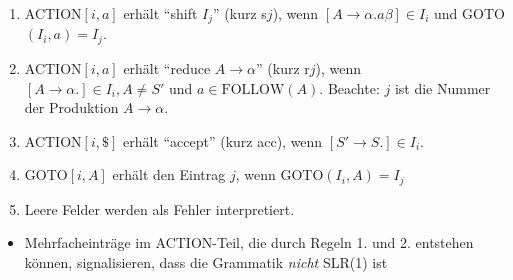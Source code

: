 \begin{enumerate}
 \item ACTION$[i,a]$ erhält "`shift $I_j$"' (kurz s$j$), wenn $[A \to \alpha.a\beta] \in I_i$ und GOTO$(I_i,a) = I_j$.
 \item ACTION$[i,a]$ erhält "`reduce $A \to \alpha$"' (kurz r$j$), wenn $[A \to \alpha.] \in I_i, A \neq S'$ und $a \in \text{FOLLOW}(A)$. Beachte: $j$ ist die Nummer der Produktion $A \to \alpha.$
 \item ACTION$[i,\$]$ erhält "`accept"' (kurz acc), wenn $[S' \to S.] \in I_i$.
 \item GOTO$[i,A]$ erhält den Eintrag $j$, wenn GOTO$(I_i, A) = I_j$
 \item Leere Felder werden als Fehler interpretiert.
\end{enumerate}
\begin{itemize}
 \item Mehrfacheinträge im ACTION-Teil, die durch Regeln 1. und 2. entstehen können, signalisieren, dass die Grammatik \emph{nicht} SLR(1) ist
\end{itemize}
